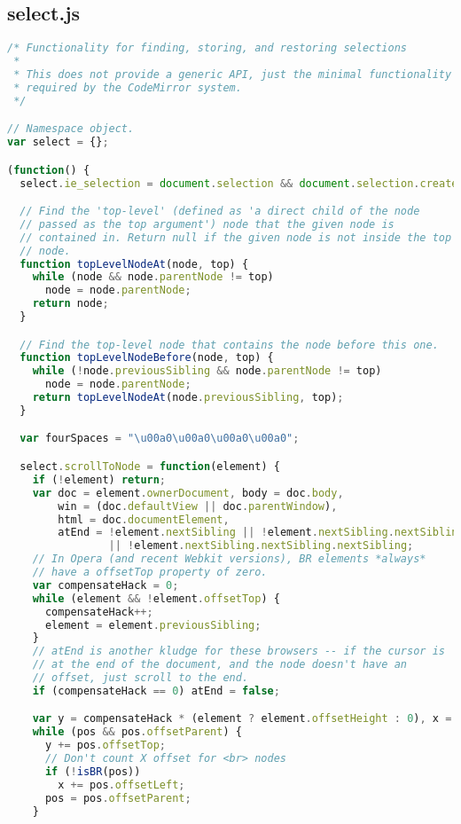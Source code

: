 \subsection{select.js}
\begin{lstlisting}[language=Javascript]
/* Functionality for finding, storing, and restoring selections
 *
 * This does not provide a generic API, just the minimal functionality
 * required by the CodeMirror system.
 */

// Namespace object.
var select = {};

(function() {
  select.ie_selection = document.selection && document.selection.createRangeCollection;

  // Find the 'top-level' (defined as 'a direct child of the node
  // passed as the top argument') node that the given node is
  // contained in. Return null if the given node is not inside the top
  // node.
  function topLevelNodeAt(node, top) {
    while (node && node.parentNode != top)
      node = node.parentNode;
    return node;
  }

  // Find the top-level node that contains the node before this one.
  function topLevelNodeBefore(node, top) {
    while (!node.previousSibling && node.parentNode != top)
      node = node.parentNode;
    return topLevelNodeAt(node.previousSibling, top);
  }

  var fourSpaces = "\u00a0\u00a0\u00a0\u00a0";

  select.scrollToNode = function(element) {
    if (!element) return;
    var doc = element.ownerDocument, body = doc.body,
        win = (doc.defaultView || doc.parentWindow),
        html = doc.documentElement,
        atEnd = !element.nextSibling || !element.nextSibling.nextSibling
                || !element.nextSibling.nextSibling.nextSibling;
    // In Opera (and recent Webkit versions), BR elements *always*
    // have a offsetTop property of zero.
    var compensateHack = 0;
    while (element && !element.offsetTop) {
      compensateHack++;
      element = element.previousSibling;
    }
    // atEnd is another kludge for these browsers -- if the cursor is
    // at the end of the document, and the node doesn't have an
    // offset, just scroll to the end.
    if (compensateHack == 0) atEnd = false;

    var y = compensateHack * (element ? element.offsetHeight : 0), x = 0, pos = element;
    while (pos && pos.offsetParent) {
      y += pos.offsetTop;
      // Don't count X offset for <br> nodes
      if (!isBR(pos))
        x += pos.offsetLeft;
      pos = pos.offsetParent;
    }


\end{lstlisting}
